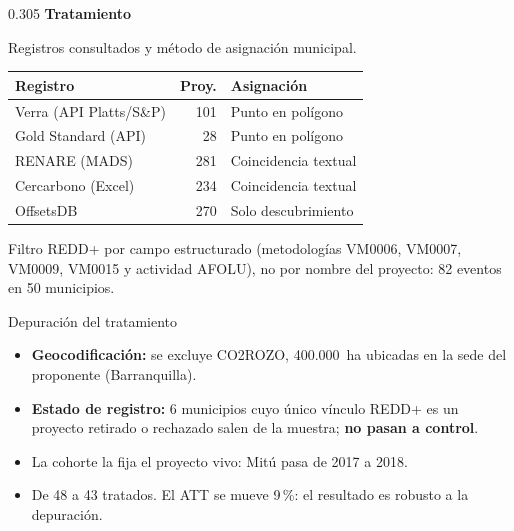 \documentclass[final,t]{beamer}
\newcommand{\nota}[1]{{\color{tenue}\small #1\par}}
\begin{document}
\begin{frame}[t]{}
\begin{columns}[t]
\begin{column}{0.305\paperwidth}
\textbf{\large Tratamiento}
\nota{Registros consultados y método de asignación municipal.}
\begin{center}
\begin{tabularx}{\linewidth}{Xrl}
\toprule
\rowcolor{dosel}
\textcolor{papel}{\textbf{Registro}} & \textcolor{papel}{\textbf{Proy.}} &
\textcolor{papel}{\textbf{Asignación}}\\
\midrule
Verra (API Platts/S\&P) & 101 & Punto en polígono\\
Gold Standard (API)     & 28  & Punto en polígono\\
RENARE (MADS)           & 281 & Coincidencia textual\\
Cercarbono (Excel)      & 234 & Coincidencia textual\\
OffsetsDB               & 270 & Solo descubrimiento\\
\bottomrule
\end{tabularx}
\end{center}
\nota{Filtro REDD+ por campo estructurado (metodologías VM0006, VM0007, VM0009, VM0015 y actividad
AFOLU), no por nombre del proyecto: 82 eventos en 50 municipios.}

\begin{caja}{Depuración del tratamiento}
\begin{itemize}
  \item \textbf{Geocodificación:} se excluye CO2ROZO, 400.000~ha ubicadas en la sede del proponente
        (Barranquilla).
  \item \textbf{Estado de registro:} 6 municipios cuyo único vínculo REDD+ es un proyecto
        retirado o rechazado salen de la muestra; \textbf{no pasan a control}.
  \item La cohorte la fija el proyecto vivo: Mitú pasa de 2017 a 2018.
  \item[\textcolor{amazonia}{\rule{0.45ex}{0.45ex}}] De 48 a 43 tratados. El ATT se mueve 9\,\%:
        el resultado es robusto a la depuración.
\end{itemize}
\end{caja}


\end{column}
\end{columns}
\end{frame}
\end{document}
